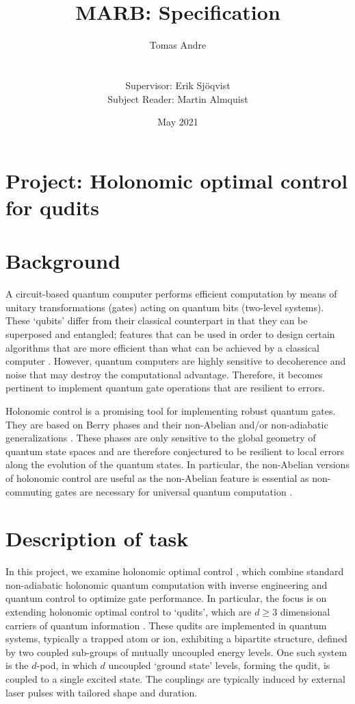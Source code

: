 \documentclass{article}
\title{MARB: Specification}
\author{Tomas Andre \\ 
\\ 
\\ 
Supervisor: Erik Sj\"oqvist \\ 
Subject Reader: Martin Almquist}
\date{May 2021}
\begin{document}
\maketitle

\section*{Project: Holonomic optimal control for qudits}

\section*{Background} 
A circuit-based quantum computer performs efficient computation by means of 
unitary transformations (gates) acting on quantum bits (two-level systems). These 
`qubits' differ from their classical counterpart in that they can be superposed and 
entangled; features that can be used in order to design certain algorithms that are 
more efficient than what can be achieved by a classical computer \cite{shor94,grover97}. 
However, quantum computers are highly sensitive to decoherence and noise that 
may destroy the computational advantage. Therefore, it becomes pertinent to 
implement quantum gate operations that are resilient to errors. 

Holonomic control is a promising tool for implementing robust quantum gates. 
They are based on Berry phases \cite{berry84} and their non-Abelian and/or 
non-adiabatic generalizations \cite{wilczek84,aharonov87,anandan88}. These phases 
are only sensitive to the global geometry of quantum state spaces and are therefore 
conjectured to be resilient to local errors along the evolution of the quantum states. 
In particular, the non-Abelian versions of holonomic control are useful as the non-Abelian 
feature is essential as non-commuting gates are necessary for universal quantum 
computation \cite{zanardi99,sjoqvist12}. 

\section*{Description of task}
In this project, we examine holonomic optimal control \cite{liu19,li20}, which combine standard 
non-adiabatic holonomic quantum computation \cite{sjoqvist12} with inverse engineering 
and quantum control to optimize gate performance.  In particular, the focus is on extending 
holonomic optimal control  to  `qudits', which are $d\geq 3$ dimensional carriers of 
quantum information \cite{wang20}. These qudits are implemented in quantum systems, 
typically a trapped atom or ion, exhibiting a bipartite structure, defined by two coupled 
sub-groups of mutually uncoupled energy levels. One such system is the $d$-pod, in which 
$d$ uncoupled `ground state' levels, forming the qudit, is coupled to a single excited state. 
The couplings are typically induced by external laser pulses with tailored shape and duration. 
\end{document}
